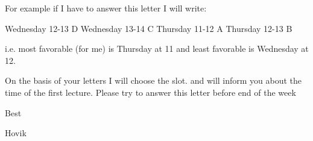For example if I have to answer this letter I will write:

    Wednesday 12-13  D
    Wednesday  13-14  C
    Thursday   11-12  A
    Thursday   12-13  B

i.e. most favorable (for me) is Thursday at 11
and least favorable is Wednesday at 12.

On the basis of your letters I will choose the slot.
and will inform you about the time of the first lecture.
Please try to answer this letter before
end of the week


   Best

            Hovik

